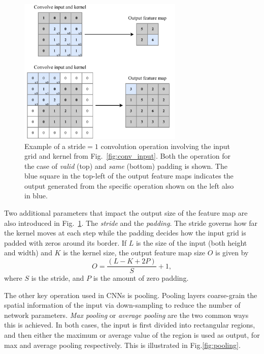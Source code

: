 \begin{figure} %
    \includegraphics[width=0.7\textwidth]{diagrams/6-cvn/conv_operation.pdf}
    \caption[Example of convolutional operation.]
    {Example of a $\mathrm{stride}=1$ convolution operation involving the input grid and kernel
        from Fig.~\ref{fig:conv_input}. Both the operation for the case of \emph{valid} (top) and
        \emph{same} (bottom) padding is shown. The blue square in the top-left of the output
        feature maps indicates the output generated from the specific operation shown on the left
        also in blue.}
    \label{fig:conv_operation}
\end{figure}

Two additional parameters that impact the output size of the feature map are also introduced in
Fig.~\ref{fig:conv_operation}. The \emph{stride} and the \emph{padding}. The stride governs how
far the kernel moves at each step while the padding decides how the input grid is padded with
zeros around its border. If $L$ is the size of the input (both height and width) and $K$ is the
kernel size, the output feature map size $O$ is given by
\begin{equation}
    O=\frac{(L-K+2P)}{S}+1,
    \label{eq:conv_size}
\end{equation}
where $S$ is the stride, and $P$ is the amount of zero padding.

The other key operation used in CNNs is pooling. Pooling layers coarse-grain the spatial
information of the input via down-sampling to reduce the number of network parameters. \emph{Max
    pooling} or \emph{average pooling} are the two common ways this is achieved. In both cases, the
input is first divided into rectangular regions, and then either the maximum or average value of
the region is used as output, for max and average pooling respectively. This is illustrated in
Fig.\ref{fig:pooling}.

